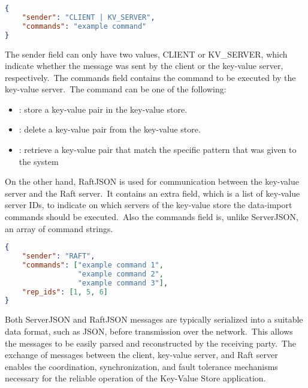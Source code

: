 \documentclass{article}
\begin{document}
\begin{lstlisting}[language=json, caption={ServerJSON},label={lst:ServerJSON}]
{
    "sender": "CLIENT | KV_SERVER",
    "commands": "example command"
}
\end{lstlisting}

The sender field can only have two values, CLIENT or KV\_SERVER, which indicate whether the
message was sent by the client or the key-value server, respectively.\ The commands field
contains the command to be executed by the key-value server.\ The command can be one of
the following:
\begin{itemize}
    \item {}: store a key-value pair in the key-value store.
    \item {}: delete a key-value pair from the key-value store.
    \item {}: retrieve a key-value pair that match the specific pattern that
                           was given to the system
\end{itemize}

On the other hand, RaftJSON is used for communication between the key-value server and the
Raft server.\ It contains an extra field, which is a list of key-value server IDs, to indicate
on which servers of the key-value store the data-import commands should be executed.\ Also
the commands field is, unlike ServerJSON, an array of command strings.

\begin{lstlisting}[language=json, caption={RaftJSON},label={lst:RaftJSON}]
{
    "sender": "RAFT",
    "commands": ["example command 1",
                 "example command 2",
                 "example command 3"],
    "rep_ids": [1, 5, 6]
}
\end{lstlisting}

Both ServerJSON and RaftJSON messages are typically serialized into a suitable data format,
such as JSON, before transmission over the network.\ This allows the messages to be easily
parsed and reconstructed by the receiving party.\ The exchange of messages between the client,
key-value server, and Raft server enables the coordination, synchronization, and fault tolerance
mechanisms necessary for the reliable operation of the Key-Value Store application.
\end{document}
